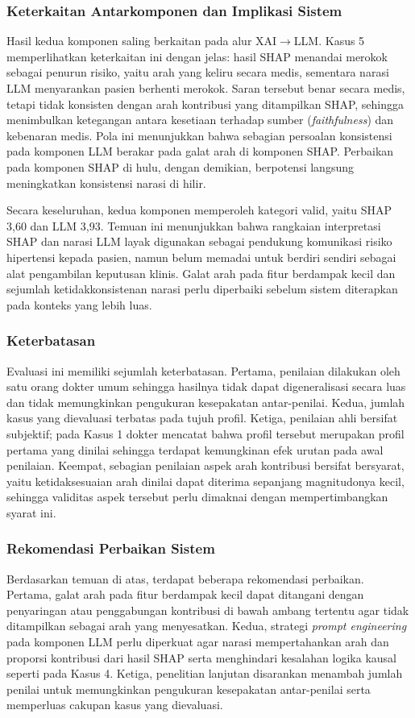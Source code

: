 \subsubsection{Keterkaitan Antarkomponen dan Implikasi Sistem}
Hasil kedua komponen saling berkaitan pada alur XAI$\rightarrow$LLM. Kasus 5
memperlihatkan keterkaitan ini dengan jelas: hasil SHAP menandai merokok sebagai
penurun risiko, yaitu arah yang keliru secara medis, sementara narasi LLM menyarankan
pasien berhenti merokok. Saran tersebut benar secara medis, tetapi tidak konsisten
dengan arah kontribusi yang ditampilkan SHAP, sehingga menimbulkan ketegangan antara
kesetiaan terhadap sumber (\emph{faithfulness}) dan kebenaran medis. Pola ini
menunjukkan bahwa sebagian persoalan konsistensi pada komponen LLM berakar pada galat
arah di komponen SHAP. Perbaikan pada komponen SHAP di hulu, dengan demikian,
berpotensi langsung meningkatkan konsistensi narasi di hilir.

Secara keseluruhan, kedua komponen memperoleh kategori valid, yaitu SHAP 3,60 dan
LLM 3,93. Temuan ini menunjukkan bahwa rangkaian interpretasi SHAP dan narasi LLM layak
digunakan sebagai pendukung komunikasi risiko hipertensi kepada pasien, namun belum
memadai untuk berdiri sendiri sebagai alat pengambilan keputusan klinis. Galat arah
pada fitur berdampak kecil dan sejumlah ketidakkonsistenan narasi perlu diperbaiki
sebelum sistem diterapkan pada konteks yang lebih luas.

\subsubsection{Keterbatasan}
Evaluasi ini memiliki sejumlah keterbatasan. Pertama, penilaian dilakukan oleh satu
orang dokter umum sehingga hasilnya tidak dapat digeneralisasi secara luas dan tidak
memungkinkan pengukuran kesepakatan antar-penilai. Kedua, jumlah kasus yang dievaluasi
terbatas pada tujuh profil. Ketiga, penilaian ahli bersifat subjektif; pada Kasus 1
dokter mencatat bahwa profil tersebut merupakan profil pertama yang dinilai sehingga
terdapat kemungkinan efek urutan pada awal penilaian. Keempat, sebagian penilaian aspek
arah kontribusi bersifat bersyarat, yaitu ketidaksesuaian arah dinilai dapat diterima
sepanjang magnitudonya kecil, sehingga validitas aspek tersebut perlu dimaknai dengan
mempertimbangkan syarat ini.

\subsubsection{Rekomendasi Perbaikan Sistem}
Berdasarkan temuan di atas, terdapat beberapa rekomendasi perbaikan. Pertama, galat
arah pada fitur berdampak kecil dapat ditangani dengan penyaringan atau penggabungan
kontribusi di bawah ambang tertentu agar tidak ditampilkan sebagai arah yang
menyesatkan. Kedua, strategi \emph{prompt engineering} pada komponen LLM perlu
diperkuat agar narasi mempertahankan arah dan proporsi kontribusi dari hasil SHAP serta
menghindari kesalahan logika kausal seperti pada Kasus 4. Ketiga, penelitian lanjutan
disarankan menambah jumlah penilai untuk memungkinkan pengukuran kesepakatan
antar-penilai serta memperluas cakupan kasus yang dievaluasi.

